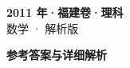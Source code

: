 \documentclass[zihao=-4, a4paper]{ctexart}
\begin{document}
\begin{center}
  {\Large\bfseries 2011 年·福建卷·理科}\\[4pt]
  {\large 数学 · 解析版}
\end{center}
\medskip
{}

\clearpage
{}
\begin{center}{\Large\bfseries 参考答案与详细解析}\end{center}
\medskip

\end{document}
